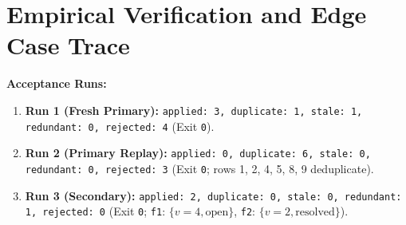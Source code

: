 \documentclass[10pt,a4paper]{article}
\begin{document}
\section{Empirical Verification and Edge Case Trace}

\textbf{Acceptance Runs:}
\begin{enumerate}[leftmargin=1.5em, noitemsep, topsep=2pt]
    \item \textbf{Run 1 (Fresh Primary):} \texttt{applied: 3, duplicate: 1, stale: 1, redundant: 0, rejected: 4} (Exit \texttt{0}).
    \item \textbf{Run 2 (Primary Replay):} \texttt{applied: 0, duplicate: 6, stale: 0, redundant: 0, rejected: 3} (Exit \texttt{0}; rows 1, 2, 4, 5, 8, 9 deduplicate).
    \item \textbf{Run 3 (Secondary):} \texttt{applied: 2, duplicate: 0, stale: 0, redundant: 1, rejected: 0} (Exit \texttt{0}; \texttt{f1}: $\{v=4, \text{open}\}$, \texttt{f2}: $\{v=2, \text{resolved}\}$).
\end{enumerate}
\end{document}
